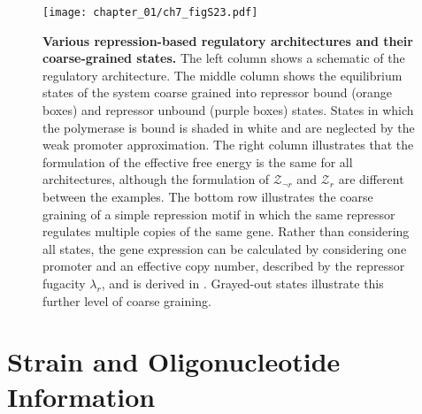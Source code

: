 \documentclass[12pt]{caltech_thesis}
\begin{document}
\hypertarget{fig:twostate_archs}{%
\begin{figure}
\centering
\texttt{[image: chapter\_01/ch7\_figS23.pdf]}
\caption[{Various repression-based regulatory architectures and their
coarse-grained states.}]{\textbf{Various repression-based regulatory
architectures and their coarse-grained states.} The left column shows a
schematic of the regulatory architecture. The middle column shows the
equilibrium states of the system coarse grained into repressor bound
(orange boxes) and repressor unbound (purple boxes) states. States in
which the polymerase is bound is shaded in white and are neglected by
the weak promoter approximation. The right column illustrates that the
formulation of the effective free energy is the same for all
architectures, although the formulation of \(\mathcal{Z}_{\neg r}\) and
\(\mathcal{Z}_r\) are different between the examples. The bottom row
illustrates the coarse graining of a simple repression motif in which
the same repressor regulates multiple copies of the same gene. Rather
than considering all states, the gene expression can be calculated by
considering one promoter and an effective copy number, described by the
repressor fugacity \(\lambda_r\), and is derived in
\textcite{weinert2014}. Grayed-out states illustrate this further level
of coarse graining.}
\label{fig:twostate_archs}
\end{figure}
}

\hypertarget{strain-and-oligonucleotide-information}{%
\section{Strain and Oligonucleotide
Information}\label{strain-and-oligonucleotide-information}}
\end{document}
